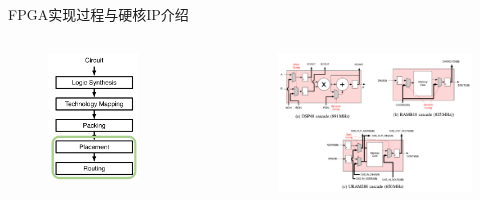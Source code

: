 \documentclass[10pt]{beamer}
\begin{document}
\begin{frame}{FPGA实现过程与硬核IP介绍}

  \begin{columns}[T, onlytextwidth]
      \begin{figure}
        \includegraphics[width=0.7\textwidth]{img/cad}
      \end{figure}
    

    \begin{figure}
      \includegraphics[width=1.1\textwidth]{img/hardblocks}
    \end{figure}  



\end{columns}
\end{frame}
\end{document}
